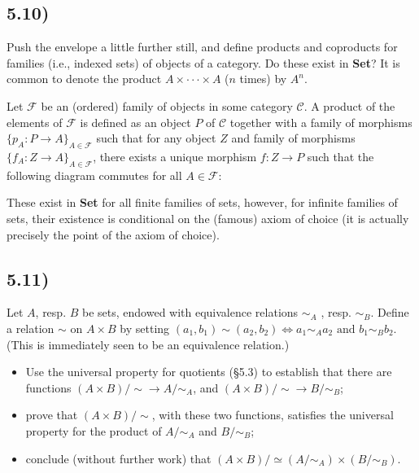 \subsection*{5.10)}

Push the envelope a little further still, and deﬁne products and coproducts for families (i.e., indexed sets) of objects of a category. Do these exist in \textbf{Set}? It is common to denote the product $A \times \cdot \cdot \cdot \times A$ ($n$ times) by $A^n$.

Let $\mathcal{F}$ be an (ordered) family of objects in some category $\mathcal{C}$. A product of the elements of $\mathcal{F}$ is defined as an object $P$ of $\mathcal{C}$ together with a family of morphisms $\{p_A : P \to A\}_{A \in \mathcal{F}}$ such that for any object $Z$ and family of morphisms $\{f_A : Z \to A\}_{A \in \mathcal{F}}$, there exists a unique morphism $f : Z \to P$ such that the following diagram commutes for all $A \in \mathcal{F}$:


These exist in \textbf{Set} for all finite families of sets, however, for infinite families of sets, their existence is conditional on the (famous) axiom of choice (it is actually precisely the point of the axiom of choice).




\subsection*{5.11)}

Let $A$, resp. $B$ be sets, endowed with equivalence relations $\sim_A$ , resp. $\sim_B$. Define a relation $\sim$ on $A \times B$ by setting $(a_1, b_1) \sim (a_2, b_2) \Leftrightarrow a_1 \sim_A a_2 \text{ and } b_1 \sim_B b_2.$ (This is immediately seen to be an equivalence relation.)
\begin{itemize}
	\item Use the universal property for quotients (§5.3) to establish that there are functions $(A \times B)/\sim \rightarrow A/\sim_A$, and $(A \times B)/\sim \rightarrow B/\sim_B$;
	\item prove that $(A \times B)/\sim$, with these two functions, satisfies the universal property for the product of $A/\sim_A$ and $B/\sim_B$;
	\item conclude (without further work) that $(A \times B)/ \simeq (A / \sim_A) \times (B / \sim_B)$.
\end{itemize}

